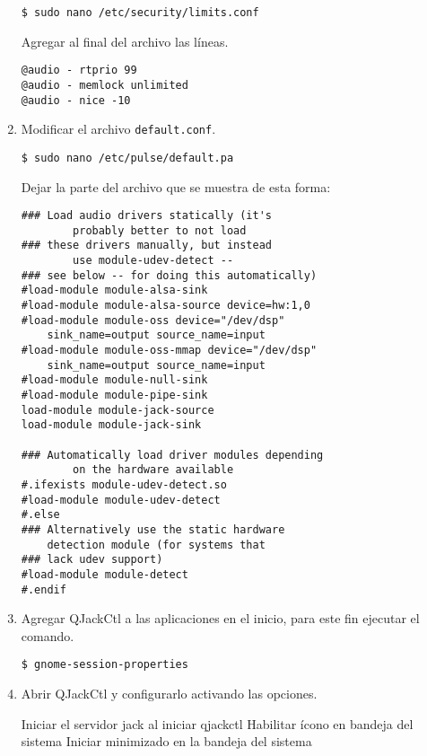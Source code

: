 \begin{multicols}{2}
\begin{enumerate}
\begin{lstlisting}
$ sudo nano /etc/security/limits.conf 
\end{lstlisting}

Agregar al final del archivo las líneas.

\begin{lstlisting}
@audio - rtprio 99
@audio - memlock unlimited
@audio - nice -10
\end{lstlisting}

\item Modificar el archivo \verb!default.conf!.
 
\begin{lstlisting}
$ sudo nano /etc/pulse/default.pa 
\end{lstlisting}

Dejar la parte del archivo que se muestra de esta forma:

\begin{lstlisting}
### Load audio drivers statically (it's 
		probably better to not load
### these drivers manually, but instead 
		use module-udev-detect --
### see below -- for doing this automatically)
#load-module module-alsa-sink
#load-module module-alsa-source device=hw:1,0
#load-module module-oss device="/dev/dsp" 	
	sink_name=output source_name=input
#load-module module-oss-mmap device="/dev/dsp" 
	sink_name=output source_name=input
#load-module module-null-sink
#load-module module-pipe-sink
load-module module-jack-source
load-module module-jack-sink

### Automatically load driver modules depending 
		on the hardware available
#.ifexists module-udev-detect.so
#load-module module-udev-detect
#.else
### Alternatively use the static hardware 
	detection module (for systems that
### lack udev support)
#load-module module-detect
#.endif
\end{lstlisting}

\item Agregar QJackCtl a las aplicaciones en el inicio, para este fin ejecutar el comando.

\begin{lstlisting}
$ gnome-session-properties
\end{lstlisting}

\item Abrir QJackCtl y configurarlo activando las opciones.

    Iniciar el servidor jack al iniciar qjackctl
    Habilitar ícono en bandeja del sistema
    Iniciar minimizado en la bandeja del sistema


\end{enumerate}
\end{multicols}
